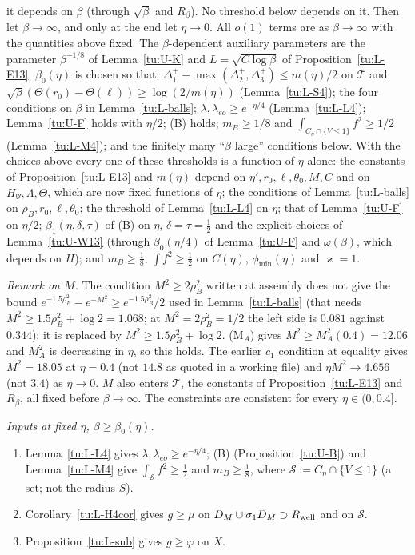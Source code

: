 it depends on $\beta$ (through $\sqrt\beta$ and $R_\beta$). No threshold below depends on it.
Then let $\beta\to\infty$, and only at the end let $\eta\to0$. All $o(1)$ terms are as $\beta\to\infty$ with the quantities above
fixed. The $\beta$-dependent auxiliary parameters are the parameter $\beta^{-1/8}$ of Lemma~\ref{tu:U-K} and $L=\sqrt{C\log\beta}$ of
Proposition~\ref{tu:L-E13}. $\beta_0(\eta)$ is chosen so that: $\Delta_1^++\max(\Delta_2^+,\Delta_3^+)\le m(\eta)/2$ on $\mathcal T$ and $\sqrt\beta(\Theta(r_0)-\Theta(\ell))\ge\log(2/m(\eta))$ (Lemma~\ref{tu:L-S4}); the four conditions on $\beta$ in Lemma~\ref{tu:L-balls};
$\lambda,\lambda_{eo}\ge e^{-\eta/4}$ (Lemma~\ref{tu:L-L4}); Lemma~\ref{tu:U-F} holds with $\eta/2$; (B) holds; $m_B\ge1/8$ and
$\int_{C_\eta\cap\{V\le1\}}f^2\ge1/2$ (Lemma~\ref{tu:L-M4}); and the finitely many ``$\beta$ large'' conditions below.
With the choices above every one of these thresholds is a function of $\eta$ alone: the constants of
Proposition~\ref{tu:L-E13} and $m(\eta)$ depend on $\eta',r_0,\ell,\theta_0,M,C$ and on $H_\Psi,\Lambda,\tilde\Theta$, which are now
fixed functions of $\eta$; the conditions of Lemma~\ref{tu:L-balls} on $\rho_B,r_0,\ell,\theta_0$; the threshold of
Lemma~\ref{tu:L-L4} on $\eta$; that of Lemma~\ref{tu:U-F} on $\eta/2$; $\beta_1(\eta,\delta,\tau)$ of (B) on $\eta$, $\delta=\tau=\frac12$ and
the explicit choices of Lemma~\ref{tu:U-W13} (through $\beta_0(\eta/4)$ of Lemma~\ref{tu:U-F} and $\omega(\beta)$, which depends on $H$);
and $m_B\ge\frac18$, $\int f^2\ge\frac12$ on $C(\eta)$, $\phi_{\min}(\eta)$ and $\varkappa=1$.

\noindent\emph{Remark on $M$.} The condition $M^2\ge2\rho_B^2$ written at assembly does not give the bound
$e^{-1.5\rho_B^2}-e^{-M^2}\ge e^{-1.5\rho_B^2}/2$ used in Lemma~\ref{tu:L-balls} (that needs $M^2\ge1.5\rho_B^2+\log2=1.068$; at $M^2=2\rho_B^2=1/2$
the left side is $0.081$ against $0.344$); it is replaced by $M^2\ge1.5\rho_B^2+\log2$. (M$_A$) gives $M^2\ge M_A^2(0.4)=12.06$ and
$M_A^2$ is decreasing in $\eta$, so this holds. The earlier $c_1$ condition at equality gives $M^2=18.05$ at $\eta=0.4$ (not $14.8$ as
quoted in a working file) and $\eta M^2\to4.656$ (not $3.4$) as $\eta\to0$. $M$ also enters $\mathcal T$, the constants of
Proposition~\ref{tu:L-E13} and $R_\beta$, all fixed before $\beta\to\infty$. The constraints are consistent for every $\eta\in(0,0.4]$.

\noindent\emph{Inputs at fixed $\eta$, $\beta\ge\beta_0(\eta)$.}
\begin{enumerate}
\item Lemma~\ref{tu:L-L4} gives $\lambda,\lambda_{eo}\ge e^{-\eta/4}$; (B) (Proposition~\ref{tu:U-B}) and Lemma~\ref{tu:L-M4} give
$\int_{\mathcal S}f^2\ge\frac12$ and $m_B\ge\frac18$, where $\mathcal S:=C_\eta\cap\{V\le1\}$ (a set; not the radius $S$).
\item Corollary~\ref{tu:L-H4cor} gives $g\ge\mu$ on $D_M\cup\sigma_1D_M\supset R_{\rm well}$ and on $\mathcal S$.
\item Proposition~\ref{tu:L-sub} gives $g\ge\varphi$ on $X$.
\end{enumerate}

